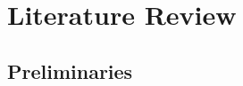 \chapter{Literature Review}
\label{cha:LitReview}

\section{Preliminaries}
\label{sec:LitReviewPrelim}
